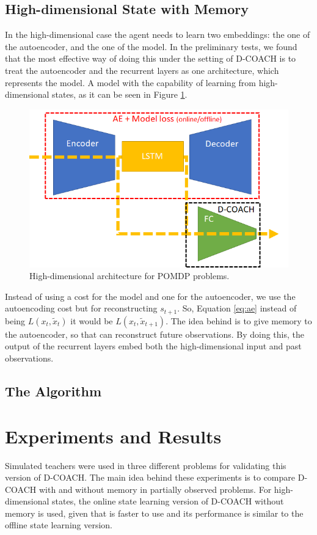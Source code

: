 \subsection{High-dimensional State with Memory}
In the high-dimensional case the agent needs to learn two embeddings: the one of the autoencoder, and the one of the model. In the preliminary tests, we found that the most effective way of doing this under the setting of D-COACH is to treat the autoencoder and the recurrent layers as one architecture, which represents the model. A model with the capability of learning from high-dimensional states, as it can be seen in Figure \ref{fig:rnn_hd}. 

\begin{figure}[h]
    \centering
    \includegraphics[width=0.6\linewidth]{imagenes/cap4/RNN_HD.png}
    \caption{High-dimensional architecture for POMDP problems.}
    \label{fig:rnn_hd}
\end{figure}

Instead of using a cost for the model and one for the autoencoder, we use the autoencoding cost but for reconstructing $s_{t+1}$. So, Equation \ref{eq:ae} instead of being $L(x_{t},\widetilde x_{t})$ it would be  $L(x_{t},\widetilde x_{t+1})$. The idea behind is to give memory to the autoencoder, so that can reconstruct future observations. By doing this, the output of the recurrent layers embed both the high-dimensional input and past observations.

\subsection{The Algorithm}

\section{Experiments and Results}
Simulated teachers were used in three different problems for validating this version of D-COACH. The main idea behind these experiments is to compare D-COACH with and without memory in partially observed problems. For high-dimensional states, the online state learning version of D-COACH without memory is used, given that is faster to use and its performance is similar to the offline state learning version. 

